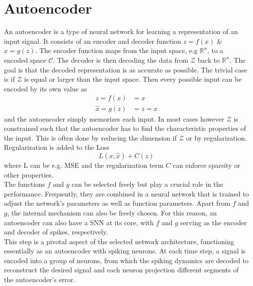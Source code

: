 \section{Autoencoder}
An autoencoder is a type of neural network for learning a representation of an input signal. It consists of an encoder and decoder function $z =f(x)$ \& $\hat{x} = g(z)$. The encoder function maps from the input space, e.g $\mathbb{R}^n$, to a encoded space $\mathcal{C}$. The decoder is then decoding the data from $\mathcal{Z}$ back to $\mathbb{R}^n$. The goal is that the decoded representation is as accurate as possible. The trivial case is if $\mathcal{Z}$ is equal or larger than the input space. Then every possible input can be encoded by its own value as
\begin{equation}
\begin{aligned}
 	z = f(x) &= x\\
 	\hat{x} = g(z) &= z = x
\end{aligned}
\end{equation}
and the autoencoder simply memorizes each input. In most cases however $\mathcal{Z}$ is constrained such that the autoencoder has to find the characteristic properties of the input. This is often done by reducing the dimension if $\mathcal{Z}$ or by regularization. Regularization is added to the Loss
\begin{equation}
	L(x,\hat{x}) + C(z)
\end{equation}
where L can be e.g. MSE and the regularization term $C$ can enforce sparsity or other properties\cite{goodfellow_deep_2016}.\\
The functions $f$ and $g$ can be selected freely but play a crucial role in the performance. Frequently, they are combined in a neural network that is trained to adjust the network's parameters as well as function parameters. Apart from $f$ and $g$, the internal mechanism can also be freely chosen. For this reason, an autoencoder can also have a \ac{SNN} at its core, with $f$ and $g$ serving as the encoder and decoder of spikes, respectively.\\
This step is a pivotal aspect of the selected network architecture, functioning essentially as an autoencoder with spiking neurons. At each time step, a signal is encoded into a group of neurons, from which the spiking dynamics are decoded to reconstruct the desired signal and each neuron projection different segments of the autoencoder's error.\\

